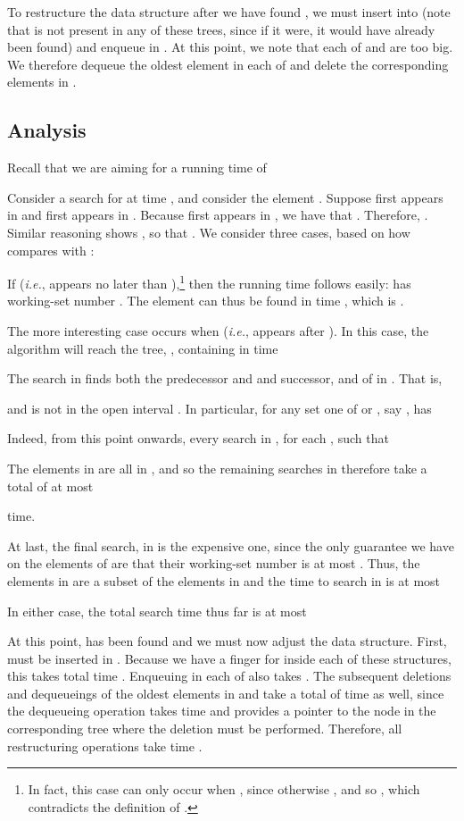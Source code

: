 \documentclass{llncs}
\newcommand{\ie}{\textsl{i.e.}}
\begin{document}
To restructure the data structure after we have found , we must insert  into  (note that  is not present in any of these trees, since if it were, it would have already been found) and enqueue  in . At this point, we note that each of  and  are too big. We therefore dequeue the oldest element in each of  and delete the corresponding elements in .

\subsection{Analysis}
\label{section:main:analysis}

Recall that we are aiming for a running time of


Consider a search for  at time , and consider the element . Suppose  first appears in  and  first appears in . Because  first appears in , we have that . Therefore, . Similar reasoning shows , so that . We consider three cases, based on how  compares with :

If  (\ie,  appears no later than ),\footnote{In fact, this case can only occur when , since otherwise , and so , which contradicts the definition of .} then the running time follows easily:  has working-set number . The element  can thus be found in time , which is .




The more interesting case occurs when  (\ie,  appears after ).  In this case, the algorithm will reach the tree, , containing  in time 

The search in  finds both the predecessor and and successor,  and  of  in .  That is,

and  is not in the open interval .  In particular,
for any set  one of  or , say , has

Indeed, from this point onwards, every search in , for each ,  such that


The elements in  are all in , and so
the remaining searches in  therefore take a total of at most

time.




At last, the final search, in  is the expensive one, since the only
guarantee we have on the elements of  are that their working-set number
is at most .  Thus, the elements in  are a subset of the elements in  and the time to search in  is at most


In either case, the total search time thus far is at most 


At this point,  has been found and we must now adjust the data structure. First,  must be inserted in . Because we have a finger for  inside each of these structures, this takes total time . Enqueuing  in each of  also takes . The subsequent deletions and dequeueings of the oldest elements in  and  take a total of  time as well, since the dequeueing operation takes  time and provides a pointer to the node in the corresponding tree where the deletion must be performed. Therefore, all restructuring operations take time .
\end{document}
